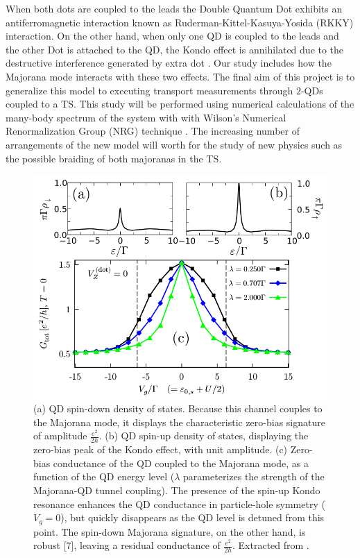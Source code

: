  When both dots are coupled to the leads the Double Quantum Dot exhibits an antiferromagnetic interaction known as  Ruderman-Kittel-Kasuya-Yosida (RKKY) interaction\cite{ruderman_indirect_1954,kasuya_theory_1956,yosida_magnetic_1957}. On the other hand, when only one QD is coupled to the leads and the other Dot is attached to the QD,  the Kondo effect is annihilated due to the destructive interference  generated by extra dot \cite{dias_da_silva_transmission_2008}. Our study includes how the Majorana mode interacts with these two effects.  
The final aim of this project is to generalize this model to executing
transport measurements through $2$-QDs coupled to a TS. This study
will be performed using numerical calculations of the many-body spectrum
of the system with with Wilson\textquoteright s Numerical Renormalization
Group (NRG) technique \citep{wilson_renormalization_1975}. The increasing
number of arrangements of the new model will worth for the study of
new physics such as the possible braiding\citep{kitaev_fault-tolerant_2003}
of both majoranas in the TS. 


\begin{figure}[ht]
\centering
\includegraphics[scale=0.4]{IMAGES/Kondo-Majorana Conductivity.png}
\caption{\label{Fig-Kondo-Majorana conductance}(a) QD spin-down
density of states. Because this channel couples to the Majorana mode,
it displays the characteristic zero-bias signature of amplitude
$\frac{e^{2}}{2h}$. (b) QD spin-up density of states,
displaying the zero-bias peak of the Kondo effect, with
unit amplitude. (c) Zero-bias conductance of the QD coupled
to the Majorana mode, as a function of the QD energy level ($\lambda$
parameterizes the strength of the Majorana-QD tunnel coupling).
The presence of the spin-up Kondo resonance enhances the
QD conductance in particle-hole symmetry ($V_{g}=0$),
but quickly disappears as the QD level is detuned from this point.
The spin-down Majorana signature, on the other hand, is
robust {[}7{]}, leaving a residual conductance of $\frac{e^{2}}{2h}$.
Extracted from \citep{ruiz-tijerina_interaction_2015}.}
\end{figure}



